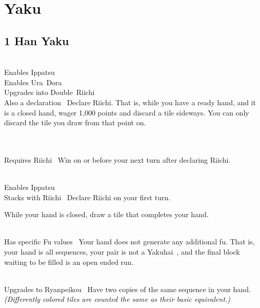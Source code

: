 \section{Yaku}\label{core:sec:yaku}

\subsection{1 Han Yaku}\label{core:ssec:1-han-yaku}

	{\closedhand \\ 
	\upgradesto Enables Ippatsu~ \\ 
	\upgradestoother Enables Ura~Dora~ \\ 
	\upgradesto Upgrades into Double~Riichi~\\
	\upgradestoother Also a declaration~}
	{Declare Riichi. That is, while you have a ready hand, and it is a closed hand, wager 1,000 points and discard a tile sideways. You can only discard the tile you draw from that point on.}

	{\closedhand \\ 
	\brokenhand \\
	\upgradesfrom Requires Riichi~}
	{Win on or before your next turn after declaring Riichi.}

	{\closedhand \\ 
	\upgradesto Enables Ippatsu~ \\ 
	\upgradesfrom Stacks with Riichi~}
	{Declare Riichi on your first turn.}

	{\closedhand}
	{While your hand is closed, draw a tile that completes your hand.}

	{\closedhand \\
	\upgradestoother Has specific Fu values~}
	{Your hand does not generate any additional fu. That is, your hand is all sequences, your pair is not a Yakuhai~, and the final block waiting to be filled is an open ended run.}

	{\closedhand \\
	\upgradesto Upgrades to Ryanpeikou~}
	{Have two copies of the same sequence in your hand. \textit{(Differently colored tiles are counted the same as their basic equivalent.)}}


